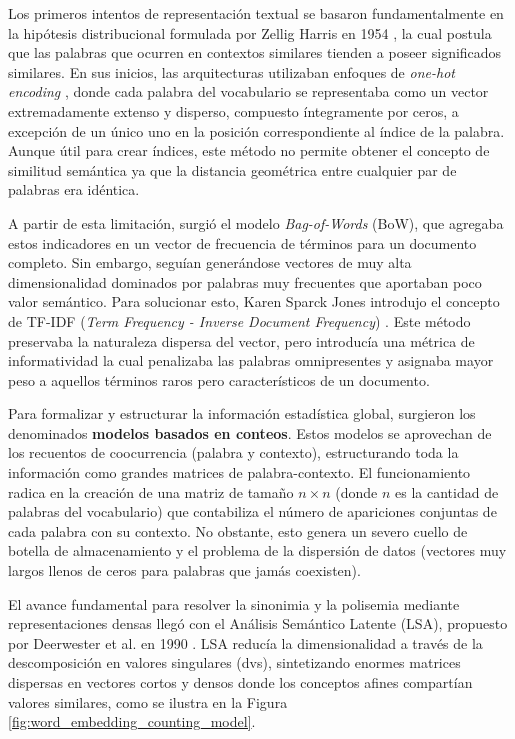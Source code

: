 Los primeros intentos de representación textual se basaron fundamentalmente en la hipótesis distribucional formulada por Zellig Harris en 1954 \cite{harris_distributional_1954}, la cual postula que las palabras que ocurren en contextos similares tienden a poseer significados similares. En sus inicios, las arquitecturas utilizaban enfoques de \textit{one-hot encoding} \cite{salton_vector_1975}, donde cada palabra del vocabulario se representaba como un vector extremadamente extenso y disperso, compuesto íntegramente por ceros, a excepción de un único uno en la posición correspondiente al índice de la palabra. Aunque útil para crear índices, este método no permite obtener el concepto de similitud semántica ya que la distancia geométrica entre cualquier par de palabras era idéntica.

A partir de esta limitación, surgió el modelo \textit{Bag-of-Words} (BoW), que agregaba estos indicadores en un vector de frecuencia de términos para un documento completo. Sin embargo, seguían generándose vectores de muy alta dimensionalidad dominados por palabras muy frecuentes que aportaban poco valor semántico. Para solucionar esto, Karen Sparck Jones introdujo el concepto de TF-IDF (\textit{Term Frequency - Inverse Document Frequency}) \cite{jones_statistical_1972}. Este método preservaba la naturaleza dispersa del vector, pero introducía una métrica de informatividad la cual penalizaba las palabras omnipresentes y asignaba mayor peso a aquellos términos raros pero característicos de un documento.

Para formalizar y estructurar la información estadística global, surgieron los denominados \textbf{modelos basados en conteos}. Estos modelos se aprovechan de los recuentos de coocurrencia (palabra y contexto), estructurando toda la información como grandes matrices de palabra-contexto. El funcionamiento radica en la creación de una matriz de tamaño $n \times n$ (donde $n$ es la cantidad de palabras del vocabulario) que contabiliza el número de apariciones conjuntas de cada palabra con su contexto. No obstante, esto genera un severo cuello de botella de almacenamiento y el problema de la dispersión de datos (vectores muy largos llenos de ceros para palabras que jamás coexisten).

El avance fundamental para resolver la sinonimia y la polisemia mediante representaciones densas llegó con el Análisis Semántico Latente (LSA), propuesto por Deerwester et al. en 1990 \cite{deerwester_indexing_1990}. LSA reducía la dimensionalidad a través de la descomposición en valores singulares (\gls{dvs}), sintetizando enormes matrices dispersas en vectores cortos y densos donde los conceptos afines compartían valores similares, como se ilustra en la Figura \ref{fig:word_embedding_counting_model}.

